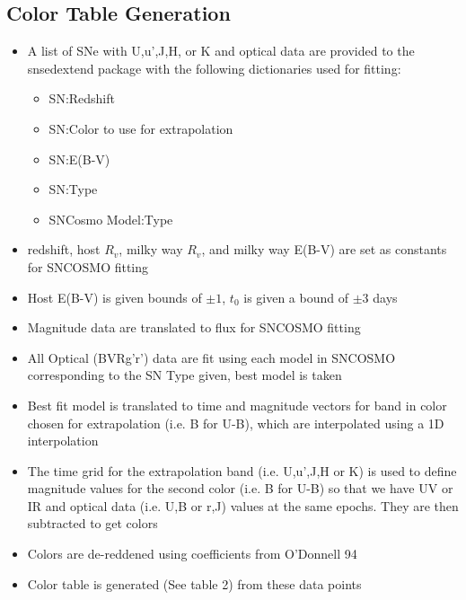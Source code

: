 \subsection{Color Table Generation}
\begin{itemize} 
\item A list of SNe with U,u',J,H, or K and optical data are provided to the snsedextend package with the following dictionaries used for fitting:
     \begin{itemize} 
        \item SN:Redshift
        \item SN:Color to use for extrapolation
        \item SN:E(B-V)
        \item SN:Type
        \item SNCosmo Model:Type
     \end{itemize}
\item redshift, host $R_v$, milky way $R_v$, and milky way E(B-V) are set as constants for SNCOSMO fitting
\item Host E(B-V) is given bounds of $\pm1$, $t_0$ is given a bound of $\pm3$ days
\item Magnitude data are translated to flux for SNCOSMO fitting
\item All Optical (BVRg'r') data are fit using each model in SNCOSMO corresponding to the SN Type given, best model is taken
\item Best fit model is translated to time and magnitude vectors for band in color chosen for extrapolation (i.e. B for U-B), which are interpolated using a 1D interpolation
\item The time grid for the extrapolation band (i.e. U,u',J,H or K) is used to define magnitude values for the second color (i.e. B for U-B) so that we have UV or IR and optical data (i.e. U,B or r,J) values at the same epochs. They are then subtracted to get colors
\item Colors are de-reddened using coefficients from O'Donnell 94
\item Color table is generated (See table 2) from these data points
\end{itemize}

